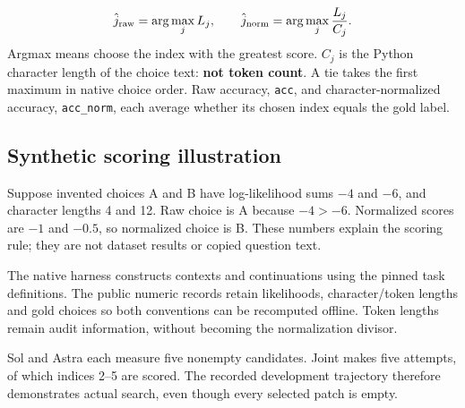 \[
\hat j_{\rm raw}=\arg\max_jL_j,\qquad
\hat j_{\rm norm}=\arg\max_j\frac{L_j}{C_j}.
\]
Argmax means choose the index with the greatest score. $C_j$ is the Python character length of the choice text: \textbf{not token count}. A tie takes the first maximum in native choice order. Raw accuracy, \texttt{acc}, and character-normalized accuracy, \texttt{acc\_norm}, each average whether its chosen index equals the gold label.

\subsection*{Synthetic scoring illustration}
Suppose invented choices A and B have log-likelihood sums $-4$ and $-6$, and character lengths 4 and 12. Raw choice is A because $-4>-6$. Normalized scores are $-1$ and $-0.5$, so normalized choice is B. These numbers explain the scoring rule; they are not dataset results or copied question text.

The native harness constructs contexts and continuations using the pinned task definitions. The public numeric records retain likelihoods, character/token lengths and gold choices so both conventions can be recomputed offline. Token lengths remain audit information, without becoming the normalization divisor.



Sol and Astra each measure five nonempty candidates. Joint makes five attempts, of which indices 2--5 are scored. The recorded development trajectory therefore demonstrates actual search, even though every selected patch is empty.




